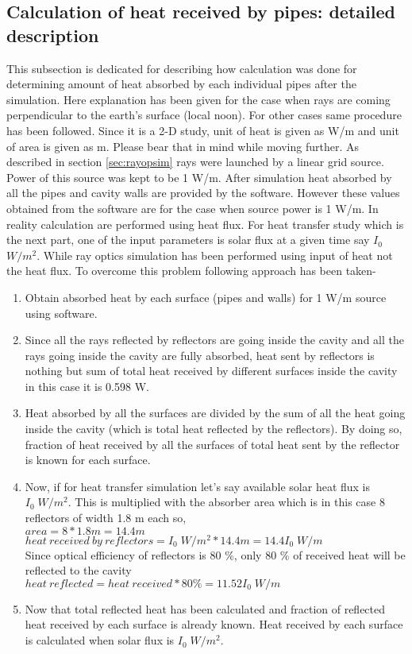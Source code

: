 \subsection{Calculation of heat received by pipes: detailed description}\label{subsec:calcHeatRecPipesDetailedDescrip}
This subsection is dedicated for describing how calculation was done for determining amount of heat absorbed by each individual pipes after the simulation. Here explanation has been given for the case when rays are coming perpendicular to the earth's surface (local noon). For other cases same procedure has been followed. Since it is a 2-D study, unit of heat is given as W/m and unit of area is given as m. Please bear that in mind while moving further. As described in section \ref{sec:rayopsim} rays were launched by a linear grid source. Power of this source was kept to be 1 W/m. After simulation heat absorbed by all the pipes and cavity walls are provided by the software. However these values obtained from the software are for the case when source power is 1 W/m. In reality calculation are performed using heat flux. For heat transfer study which is the next part, one of the input parameters is solar flux at a given time say $I_{0}$ $W/m^2$. While ray optics simulation has been performed using input of heat not the heat flux. To overcome this problem following approach has been taken-
\begin{enumerate}
\item Obtain absorbed heat by each surface (pipes and walls) for 1 W/m source using software.
\item Since all the rays reflected by reflectors are going inside the cavity and all the rays going inside the cavity are fully absorbed, heat sent by reflectors is nothing but sum of total heat received by different surfaces inside the cavity in this case it is 0.598 W.
\item Heat absorbed by all the surfaces are divided by the sum of all the heat going inside the cavity (which is total heat reflected by the reflectors). By doing so, fraction of heat received by all the surfaces of total heat sent by the reflector is known for each surface.
\item Now, if for heat transfer simulation let's say available solar heat flux is $I_{0}\; W/m^2$. This is multiplied with the absorber area which is in this case 8 reflectors of width 1.8 m each so, 
\\
$ area = 8 * 1.8 m= 14.4 m$ \\
$ heat \:received\:by\:reflectors = I_{0}\; W/m^2 * 14.4 m = 14.4I_{0}\;W/m$  
\\
Since optical efficiency of reflectors is 80 \%, only 80 \% of received heat will be reflected to the cavity \\
$heat\: reflected = heat\: received * 80 \% = 11.52I_{0}\;W/m$ \\
\item Now that total reflected heat has been calculated and fraction of reflected heat received by each surface is already known. Heat received by each surface is calculated when solar flux is $I_{0}\;W/m^2$.
\end{enumerate}
 


